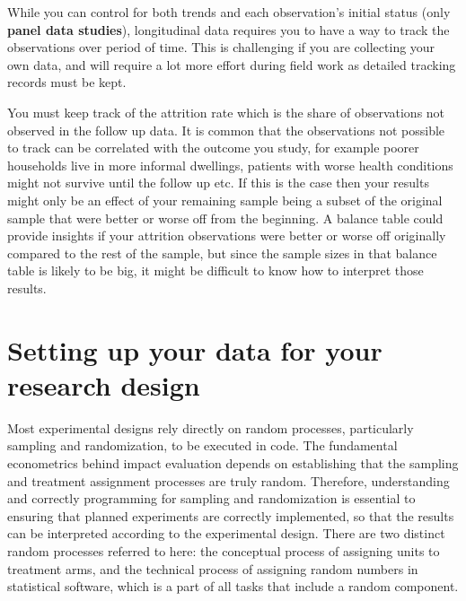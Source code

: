 While you can control for both trends 
and each observation's initial status (only \textbf{panel data studies}), 
longitudinal data requires you to have a way to track the observations over period of time.
This is challenging if you are collecting your own data, 
and will require a lot more effort during field work as detailed tracking records must be kept.

You must keep track of the attrition rate which is the share of observations not observed in the follow up data.
It is common that the observations not possible to track can be correlated with the outcome you study,
for example poorer households live in more informal dwellings,
patients with worse health conditions might not survive until the follow up etc. 
If this is the case then your results might only be an effect of your remaining sample
being a subset of the original sample that were better or worse off from the beginning.
A balance table could provide insights if your attrition observations were better or worse off 
originally compared to the rest of the sample, 
but since the sample sizes in that balance table is likely to be big, 
it might be difficult to know how to interpret those results.























\section{Setting up your data for your research design}



Most experimental designs rely directly on random processes,
particularly sampling and randomization, to be executed in code.
The fundamental econometrics behind impact evaluation
depends on establishing that the sampling
and treatment assignment processes are truly random.
Therefore, understanding and correctly programming for sampling and randomization
is essential to ensuring that planned experiments
are correctly implemented, so that the results
can be interpreted according to the experimental design.
There are two distinct random processes referred to here:
the conceptual process of assigning units to treatment arms,
and the technical process of assigning random numbers in statistical software,
which is a part of all tasks that include a random component.

